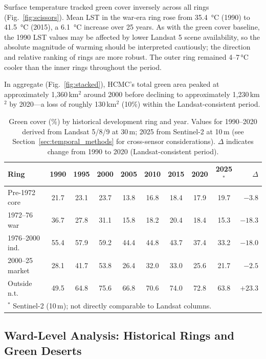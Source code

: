 \documentclass[preprint,12pt]{elsarticle}
\begin{document}
Surface temperature tracked green cover inversely across all rings (Fig.~\ref{fig:scissors}). Mean LST in the war-era ring rose from \SI{35.4}{\degreeCelsius} (1990) to \SI{41.5}{\degreeCelsius} (2015), a \SI{6.1}{\degreeCelsius} increase over 25 years. As with the green cover baseline, the 1990 LST values may be affected by lower Landsat 5 scene availability, so the absolute magnitude of warming should be interpreted cautiously; the direction and relative ranking of rings are more robust. The outer ring remained 4--7\,\si{\degreeCelsius} cooler than the inner rings throughout the period.

In aggregate (Fig.~\ref{fig:stacked}), HCMC's total green area peaked at approximately 1,360\,km$^2$ around 2000 before declining to approximately 1,230\,km$^2$ by 2020---a loss of roughly 130\,km$^2$ (10\%) within the Landsat-consistent period.

\begin{table}[htbp]
\centering
\caption{Green cover (\%) by historical development ring and year. Values for 1990--2020 derived from Landsat 5/8/9 at 30\,m; 2025 from Sentinel-2 at 10\,m (see Section~\ref{sec:temporal_methods} for cross-sensor considerations). $\Delta$ indicates change from 1990 to 2020 (Landsat-consistent period).}
\label{tab:temporal}
\begin{tabular}{lccccccccr}
\toprule
Ring & 1990 & 1995 & 2000 & 2005 & 2010 & 2015 & 2020 & 2025$^*$ & $\Delta$ \\
\midrule
Pre-1972 core    & 21.7 & 23.1 & 23.7 & 13.8 & 16.8 & 18.4 & 17.9 & 19.7 & $-3.8$ \\
1972--76 war     & 36.7 & 27.8 & 31.1 & 15.8 & 18.2 & 20.4 & 18.4 & 15.3 & $-18.3$ \\
1976--2000 ind.  & 55.4 & 57.9 & 59.2 & 44.4 & 44.8 & 43.7 & 37.4 & 33.2 & $-18.0$ \\
2000--25 market  & 28.1 & 41.7 & 53.8 & 26.4 & 32.0 & 33.0 & 25.6 & 21.7 & $-2.5$ \\
Outside n.t.     & 49.5 & 64.8 & 75.6 & 66.8 & 70.6 & 74.0 & 72.8 & 63.8 & $+23.3$ \\
\bottomrule
\multicolumn{10}{l}{\small $^*$ Sentinel-2 (10\,m); not directly comparable to Landsat columns.} \\
\end{tabular}
\end{table}

\subsection{Ward-Level Analysis: Historical Rings and Green Deserts}
\end{document}
